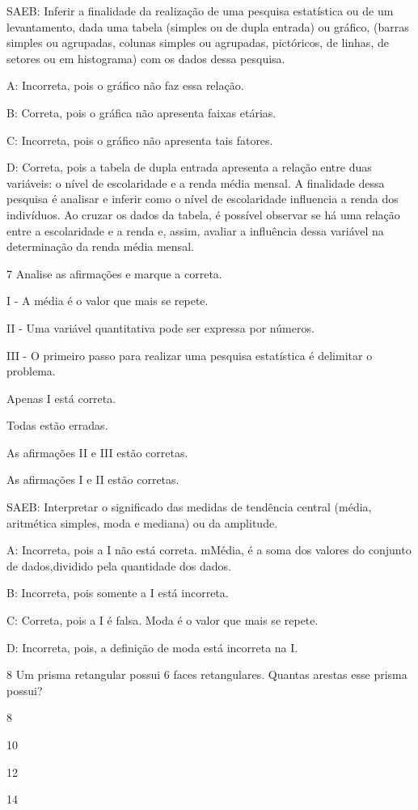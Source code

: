 {SAEB: Inferir a finalidade da realização de uma pesquisa estatística ou
de um levantamento, dada uma tabela (simples ou de dupla entrada) ou
gráfico, (barras simples ou agrupadas, colunas simples ou agrupadas,
pictóricos, de linhas, de setores ou em histograma) com os dados dessa
pesquisa.

A: Incorreta, pois o gráfico não faz essa relação.

B: Correta, pois o gráfica não apresenta faixas etárias.

C: Incorreta, pois o gráfico não apresenta tais fatores.

D: Correta, pois a tabela de dupla entrada apresenta a relação entre
duas variáveis: o nível de escolaridade e a renda média mensal. A
finalidade dessa pesquisa é analisar e inferir como o nível de
escolaridade influencia a renda dos indivíduos. Ao cruzar os dados da
tabela, é possível observar se há uma relação entre a escolaridade e a
renda e, assim, avaliar a influência dessa variável na determinação da
renda média mensal.

\num{7} Analise as afirmações e marque a correta.

I - A média é o valor que mais se repete.

II - Uma variável quantitativa pode ser expressa por números.

III - O primeiro passo para realizar uma pesquisa estatística é
delimitar o problema.
\item Apenas I está correta.
\item Todas estão erradas.
\item As afirmações II e III estão corretas.
\item As afirmações I e II estão corretas.

SAEB: Interpretar o significado das medidas de tendência central (média,
aritmética simples, moda e mediana) ou da amplitude.

A: Incorreta, pois a I não está correta. mMédia, é a soma dos valores do
conjunto de dados,dividido pela quantidade dos dados.

B: Incorreta, pois somente a I está incorreta.

C: Correta, pois a I é falsa. Moda é o valor que mais se repete.

D: Incorreta, pois, a definição de moda está incorreta na I.

\num{8} Um prisma retangular possui 6 faces retangulares. Quantas arestas
esse prisma possui?
\item 8
\item 10
\item 12
\item 14

}
